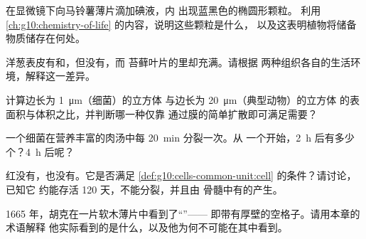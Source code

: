 \begin{exercise}[$\star\star$]\label{exo:g10:cells-common-unit:8}
在显微镜下向马铃薯薄片滴加碘液，内
出现蓝黑色的椭圆形颗粒。
利用 \cref{ch:g10:chemistry-of-life} 的内容，说明这些颗粒是什么，
以及这表明植物将储备物质储存在何处。
\end{exercise}

\begin{exercise}[$\star\star$]\label{exo:g10:cells-common-unit:9}
洋葱表皮有和，但没有，而
苔藓叶片的里却充满。请根据
两种组织各自的生活环境，解释这一差异。
\end{exercise}

\begin{exercise}[$\star\star$]\label{exo:g10:cells-common-unit:10}
计算边长为 \qty{1}{\micro m}（细菌）的立方体
与边长为 \qty{20}{\micro m}（典型动物）的立方体
的表面积与体积之比，并判断哪一种仅靠
通过膜的简单扩散即可满足需要？
\end{exercise}

\begin{exercise}[$\star\star$]\label{exo:g10:cells-common-unit:11}
一个细菌在营养丰富的肉汤中每 \qty{20}{min} 分裂一次。从
一个开始，\qty{2}{h} 后有多少个？\qty{4}{h} 后呢？
\end{exercise}

\begin{exercise}[$\star\star\star$]\label{exo:g10:cells-common-unit:12}
红没有，也没有。它是否满足
\cref{def:g10:cells-common-unit:cell} 的条件？请讨论，已知它
约能存活 120 天，不能分裂，并且由
骨髓中有的产生。
\end{exercise}

\begin{exercise}[$\star\star\star$]\label{exo:g10:cells-common-unit:13}
1665 年，胡克在一片软木薄片中看到了“”——
即带有厚壁的空格子。请用本章的术语解释
他实际看到的是什么，以及他为何不可能在其中看到。
\end{exercise}

